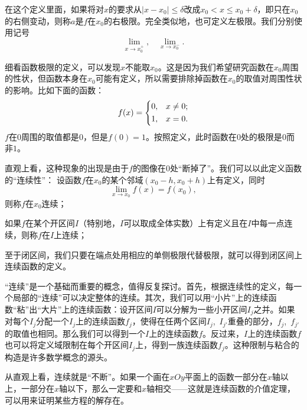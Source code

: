 在这个定义里面，如果将对$x$的要求从$|x-x_0|\leq \delta$改成$x_0<x\leq x_0+\delta$，即只在$x_0$的右侧变动，则称$a$是$f$在$x_0$的右极限。完全类似地，也可定义左极限。我们分别使用记号
\[\lim_{x\to x_0^+},\quad \lim_{x\to x_0^-}.\]

细看函数极限的定义，可以发现$x$不能取$x_0$。这是因为我们希望研究函数在$x_0$周围的性状，但函数本身在$x_0$可能有定义，所以需要排除掉函数在$x_0$的取值对周围性状的影响。比如下面的函数：
\[f(x)=
    \begin{dcases}
        0, & x\neq 0; \\
        1, & x=0.
    \end{dcases}
\]
$f$在$0$周围的取值都是$0$，但是$f(0)=1$。按照定义，此时函数在$0$处的极限是$0$而非$1$。

\begin{center}
\end{center}

直观上看，这种现象的出现是由于$f$的图像在$0$处“断掉了”。我们可以以此定义函数的“连续性”：
设函数$f$在$x_0$的某个邻域$(x_0-h,x_0+h)$上有定义，同时
\[\lim_{x\to x_0}f(x)=f(x_0),\]
则称$f$在$x_0$连续；

如果$f$在某个开区间$I$（特别地，$I$可以取成全体实数）上有定义且在$I$中每一点连续，则称$f$在$I$上连续；

至于闭区间，我们只要在端点处用相应的单侧极限代替极限，就可以得到闭区间上连续函数的定义。

“连续”是一个基础而重要的概念，值得反复探讨。首先，根据连续性的定义，每一个局部的“连续”可以决定整体的连续。其次，我们可以用“小片”上的连续函数“粘”出“大片”上的连续函数：设开区间$I$可以分解为一些小开区间$I_j$之并。如果对每个$I_j$分配一个$I_j$上的连续函数$f_j$，使得在任两个区间$I_j$,~$I_{j'}$重叠的部分，$f_j$,~$f_{j'}$的取值也相同。那么我们可以得到一个$I$上的连续函数$f$。反过来，$I$上的连续函数$f$也可以将定义域限制在每个开区间$I_j$上，得到一族连续函数$f_j$。这种限制与粘合的构造是许多数学概念的源头。

从直观上看，连续就是“不断”。如果一个画在$xOy$平面上的函数一部分在$x$轴以上，一部分在$x$轴以下，那么一定要和$x$轴相交——这就是连续函数的介值定理，可以用来证明某些方程的解存在。

